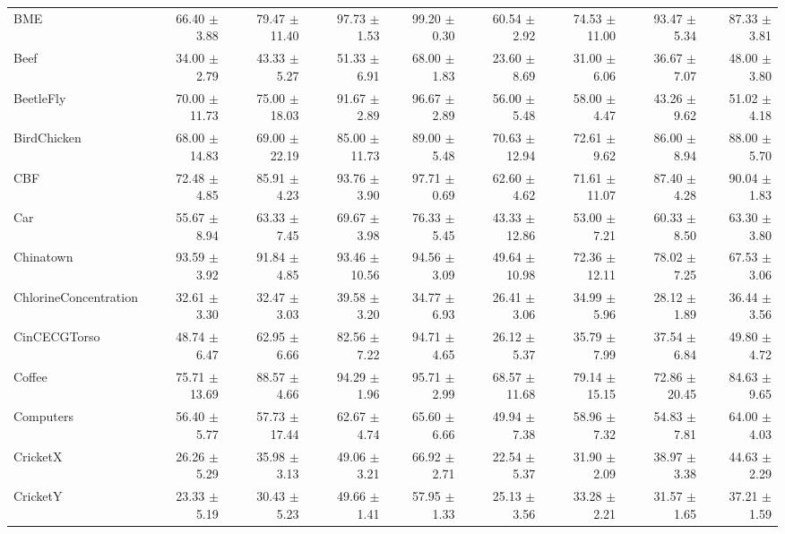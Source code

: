 \begin{landscape}
\begin{longtable}{lrrrrrrrr}
BME & 66.40 $\pm$ 3.88 & 79.47 $\pm$ 11.40 & 97.73 $\pm$ 1.53 & 99.20 $\pm$ 0.30 & 60.54 $\pm$ 2.92 & 74.53 $\pm$ 11.00 & 93.47 $\pm$ 5.34 & 87.33 $\pm$ 3.81 \\
Beef & 34.00 $\pm$ 2.79 & 43.33 $\pm$ 5.27 & 51.33 $\pm$ 6.91 & 68.00 $\pm$ 1.83 & 23.60 $\pm$ 8.69 & 31.00 $\pm$ 6.06 & 36.67 $\pm$ 7.07 & 48.00 $\pm$ 3.80 \\
BeetleFly & 70.00 $\pm$ 11.73 & 75.00 $\pm$ 18.03 & 91.67 $\pm$ 2.89 & 96.67 $\pm$ 2.89 & 56.00 $\pm$ 5.48 & 58.00 $\pm$ 4.47 & 43.26 $\pm$ 9.62 & 51.02 $\pm$ 4.18 \\
BirdChicken & 68.00 $\pm$ 14.83 & 69.00 $\pm$ 22.19 & 85.00 $\pm$ 11.73 & 89.00 $\pm$ 5.48 & 70.63 $\pm$ 12.94 & 72.61 $\pm$ 9.62 & 86.00 $\pm$ 8.94 & 88.00 $\pm$ 5.70 \\
CBF & 72.48 $\pm$ 4.85 & 85.91 $\pm$ 4.23 & 93.76 $\pm$ 3.90 & 97.71 $\pm$ 0.69 & 62.60 $\pm$ 4.62 & 71.61 $\pm$ 11.07 & 87.40 $\pm$ 4.28 & 90.04 $\pm$ 1.83 \\
Car & 55.67 $\pm$ 8.94 & 63.33 $\pm$ 7.45 & 69.67 $\pm$ 3.98 & 76.33 $\pm$ 5.45 & 43.33 $\pm$ 12.86 & 53.00 $\pm$ 7.21 & 60.33 $\pm$ 8.50 & 63.30 $\pm$ 3.80 \\
Chinatown & 93.59 $\pm$ 3.92 & 91.84 $\pm$ 4.85 & 93.46 $\pm$ 10.56 & 94.56 $\pm$ 3.09 & 49.64 $\pm$ 10.98 & 72.36 $\pm$ 12.11 & 78.02 $\pm$ 7.25 & 67.53 $\pm$ 3.06 \\
ChlorineConcentration & 32.61 $\pm$ 3.30 & 32.47 $\pm$ 3.03 & 39.58 $\pm$ 3.20 & 34.77 $\pm$ 6.93 & 26.41 $\pm$ 3.06 & 34.99 $\pm$ 5.96 & 28.12 $\pm$ 1.89 & 36.44 $\pm$ 3.56 \\
CinCECGTorso & 48.74 $\pm$ 6.47 & 62.95 $\pm$ 6.66 & 82.56 $\pm$ 7.22 & 94.71 $\pm$ 4.65 & 26.12 $\pm$ 5.37 & 35.79 $\pm$ 7.99 & 37.54 $\pm$ 6.84 & 49.80 $\pm$ 4.72 \\
Coffee & 75.71 $\pm$ 13.69 & 88.57 $\pm$ 4.66 & 94.29 $\pm$ 1.96 & 95.71 $\pm$ 2.99 & 68.57 $\pm$ 11.68 & 79.14 $\pm$ 15.15 & 72.86 $\pm$ 20.45 & 84.63 $\pm$ 9.65 \\
Computers & 56.40 $\pm$ 5.77 & 57.73 $\pm$ 17.44 & 62.67 $\pm$ 4.74 & 65.60 $\pm$ 6.66 & 49.94 $\pm$ 7.38 & 58.96 $\pm$ 7.32 & 54.83 $\pm$ 7.81 & 64.00 $\pm$ 4.03 \\
CricketX & 26.26 $\pm$ 5.29 & 35.98 $\pm$ 3.13 & 49.06 $\pm$ 3.21 & 66.92 $\pm$ 2.71 & 22.54 $\pm$ 5.37 & 31.90 $\pm$ 2.09 & 38.97 $\pm$ 3.38 & 44.63 $\pm$ 2.29 \\
CricketY & 23.33 $\pm$ 5.19 & 30.43 $\pm$ 5.23 & 49.66 $\pm$ 1.41 & 57.95 $\pm$ 1.33 & 25.13 $\pm$ 3.56 & 33.28 $\pm$ 2.21 & 31.57 $\pm$ 1.65 & 37.21 $\pm$ 1.59 \\

\end{longtable}
\end{landscape}
